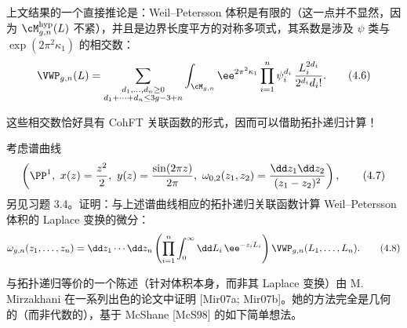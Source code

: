 上文结果的一个直接推论是：Weil--Petersson 体积是有限的（这一点并不显然，因为 $\cM^{\mathrm{hyp}}_{g,n}(L)$ 不紧），并且是边界长度平方的对称多项式，其系数是涉及 $\psi$ 类与 $\exp(2\pi^2\kappa_1)$ 的相交数：
\begin{equation}
  \VWP_{g,n}(L)=\sum_{\substack{d_1,\dots,d_n\ge0\\ d_1+\cdots+d_n\le 3g-3+n}}\int_{\cM_{g,n}}\ee^{2\pi^2\kappa_1}\prod_{i=1}^n \psi_i^{d_i}\,\frac{L_i^{2d_i}}{2^{d_i}d_i!}.
  \tag{4.6}
\end{equation}

这些相交数恰好具有 CohFT 关联函数的形式，因而可以借助拓扑递归计算！

\begin{exercise}[4.1]
考虑谱曲线
\begin{equation}
  \left(\PP^1,\ x(z)=\frac{z^2}{2},\ y(z)=\frac{\sin(2\pi z)}{2\pi},\ \omega_{0,2}(z_1,z_2)=\frac{\dd z_1\dd z_2}{(z_1-z_2)^2}\right),
  \tag{4.7}
\end{equation}
另见习题 3.4。证明：与上述谱曲线相应的拓扑递归关联函数计算 Weil--Petersson 体积的 Laplace 变换的微分：
\begin{equation}
  \omega_{g,n}(z_1,\dots,z_n)=\dd z_1\cdots\dd z_n\left(\prod_{i=1}^n\int_0^\infty \dd L_i\,\ee^{-z_iL_i}\right)\VWP_{g,n}(L_1,\dots,L_n).
  \tag{4.8}
\end{equation}
\end{exercise}

与拓扑递归等价的一个陈述（针对体积本身，而非其 Laplace 变换）由 M. Mirzakhani 在一系列出色的论文中证明 [Mir07a; Mir07b]。她的方法完全是几何的（而非代数的），基于 McShane [McS98] 的如下简单想法。

